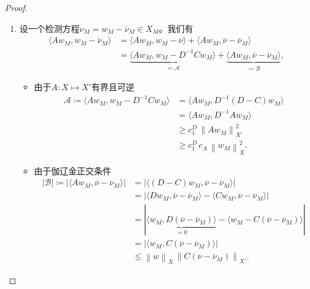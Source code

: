 \begin{proof}
\begin{enumerate}
\item
设一个检测方程$\nu_{M} = w_{M} - \overline{\nu}_{M} \in X_{M}$。我们有
\begin{equation*}
  \begin{split}
    \langle A w_{M}, w_{M} - \overline{\nu}_{M} \rangle
    & = \langle A w_{M}, w_{M} - \overline{\nu} \rangle
    + \langle A w_{M}, \overline{\nu} - \overline{\nu}_{M} \rangle \\
    & = \underbrace{
    \langle A w_{M}, w_{M} - D^{-1} C w_{M} \rangle
    }_{\eqqcolon \mathcal{A}} +
    \underbrace{
    \langle A w_{M}, \overline{\nu} - \overline{\nu}_{M} \rangle
    }_{\eqqcolon \mathcal{B}},
  \end{split}
\end{equation*}

\begin{itemize}
  \item 由于$A:X \mapsto X'$有界且可逆
  \begin{equation*}
    \begin{split}
      \mathcal{A} \coloneqq \langle A w_{M}, w_{M} - D^{-1} C w_{M} \rangle & = \langle
      A w_{M}, D^{-1} \left( D - C \right) w_{M}
      \rangle \\
      & = \langle A w_{M}, D^{-1} A w_{M} \rangle \\
      & \ge c_{1}^{D} \, \left\| A w_{M} \right\|_{X'}^{2} \\
      & \ge c_{1}^{D} \, c_{A} \, \left\| w_{M} \right\|_{X}^{2}.
    \end{split}
  \end{equation*}
  \item 由于伽辽金正交条件
  \begin{equation*}
    \begin{split}
      \left| \mathcal{B} \right| \coloneqq \left| \langle A w_{M}, \overline{\nu} - \overline{\nu}_{M} \rangle \right|
      & = \left|
      \langle
      \left( D - C \right) w_{M}, \overline{\nu} - \overline{\nu}_{M}
      \rangle
      \right| \\
      & = \left|
      \langle D w_{M}, \overline{\nu} - \overline{\nu}_{M} \rangle -
      \langle C w_{M}, \overline{\nu} - \overline{\nu}_{M} \rangle
      \right| \\
      & = \left|
      \underbrace{
      \langle
      w_{M}, D \left( \overline{\nu} - \overline{\nu}_{M} \right) \rangle
      }_{=0}
      -
      \langle
      w_{M} - C \left( \overline{\nu} - \overline{\nu}_{M} \right)
      \rangle
      \right| \\
      & = \left|
      \langle
      w_{M}, C \left( \overline{\nu} - \overline{\nu}_{M} \right)
      \rangle
      \right| \\
      & \le \left\| w \right\|_{X} \,
      \left\|
      C \left( \overline{\nu} - \overline{\nu}_{M} \right) \right\|_{X'}.
    \end{split}
  \end{equation*}
\end{itemize}


\end{enumerate}
\end{proof}
